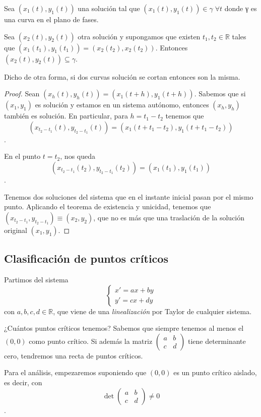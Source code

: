 \documentclass[nochap]{apuntes}
\begin{document}
\begin{theorem}
Sea $(x_1(t), y_1(t))$ una solución tal que $(x_1(t),y_1(t)) ∈ γ\; ∀t$ donde γ es una curva en el plano de fases.

Sea $(x_2(t), y_2(t))$ otra solución y supongamos que existen $t_1, t_2 ∈ ℝ$ tales que  $(x_1(t_1), y_1(t_1)) = (x_2(t_2),x_2(t_2))$. Entonces $(x_2(t), y_2(t)) ⊆ γ$.

Dicho de otra forma, si dos curvas solución se cortan entonces son la misma.
\end{theorem}

\begin{proof}
Sean $(x_h(t),y_h(t)) = (x_1(t+h), y_1(t+h))$. Sabemos que si $(x_1,y_1)$ es solución y estamos en un sistema autónomo, entonces $(x_h, y_h)$ también es solución. En particular, para $h=t_1 - t_2$ tenemos que \[ (x_{t_2 - t_1}(t),y_{t_2 - t_1}(t)) = (x_1(t+t_1-t_2),y_1(t+t_1-t_2)) \].

En el punto $t=t_2$, nos queda \[ (x_{t_2 - t_1}(t_2),y_{t_2 - t_1}(t_2)) = (x_1(t_1),y_1(t_1)) \].

Tenemos dos soluciones del sistema que en el instante inicial pasan por el mismo punto. Aplicando el teorema de existencia y unicidad, tenemos que $(x_{t_2 - t_1},y_{t_2 - t_1})\equiv (x_2,y_2)$, que no es más que una traslación de la solución original $(x_1,y_1)$.
\end{proof}

\subsection{Clasificación de puntos críticos}

Partimos del sistema \[ \begin{cases} x' = ax + by \\ y' = cx + dy \end{cases} \] con $a,b,c,d∈ℝ$, que viene de una \textit{linealización} por Taylor de cualquier sistema.

¿Cuántos puntos críticos tenemos? Sabemos que siempre tenemos al menos el $(0,0)$ como punto crítico. Si además la matriz $\begin{pmatrix} a & b \\ c & d \end{pmatrix}$ tiene determinante cero, tendremos una recta de puntos críticos.

Para el análisis, empezaremos suponiendo que $(0,0)$ es un punto crítico aislado, es decir, con \[ \det \begin{pmatrix} a & b \\ c & d \end{pmatrix} ≠ 0 \]. 
\end{document}
